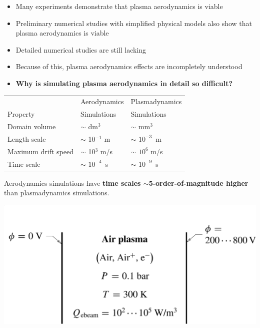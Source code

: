 \documentclass{projector}
\def\tlb{\\[0.2em]}
\begin{document}
\begin{slide}
\vfill
{}
    \begin{itemize}
      \item Many experiments demonstrate that plasma aerodynamics is viable    
      \item Preliminary numerical studies with simplified physical models also show that plasma aerodynamics is viable 
      \item Detailed numerical studies are still lacking    
      \item Because of this, plasma aerodynamics effects are incompletely understood  
      \item {\bf Why is simulating plasma aerodynamics in detail so difficult?}
    \end{itemize}
\vfill
\vfill
\end{slide}



\begin{slide}
\vfill
\centering
\begin{tabular}{lll}
\toprule
 ~ & Aerodynamics  & Plasmadynamics   \\
Property& Simulations & Simulations \\ 
\midrule
Domain volume     &$\sim$ dm$^3$   & $\sim$ mm$^3$  \tlb
Length scale      & $\sim$ 10$^{-1}$ m  & $\sim$  $10^{-3}$~m   \tlb
Maximum drift speed      & $\sim$ 10$^3$ m/s  &  $\sim$ $10^6$ m/s \tlb
Time scale      & $\sim$ $10^{-4}$~s  & $\sim$ $10^{-9}$~s  \tlb
\bottomrule
\end{tabular}
\vfill
\flushleft
Aerodynamics simulations have {\bf time scales $\sim$5-order-of-magnitude higher} than  plasmadynamics simulations. 
\end{slide}







\begin{slide}
\vfill
   \centering
   \includegraphics[width=1.0\textwidth]{problem1.pdf}
\vfill
\end{slide}
\end{document}

